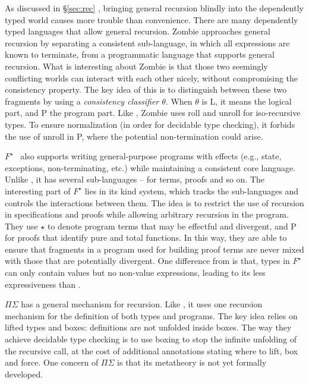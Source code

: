 As discussed in \S\ref{sec:rec}  , bringing general
recursion blindly into the dependently typed world causes more trouble
than convenience. There are many dependently typed languages that
allow general recursion. Zombie approaches general recursion by
separating a consistent sub-language, in which all expressions are
known to terminate, from a programmatic language that supports general
recursion. What is interesting about Zombie is that those two
seemingly conflicting worlds can interact with each other nicely,
without compromising the consistency property. The key idea of this is
to distinguish between these two fragments by using a
\emph{consistency classifier $\theta$}. When $\theta$ is \textsf{L},
it means the logical part, and \textsf{P} the program part. Like
\name, Zombie uses \textsf{roll} and \textsf{unroll} for iso-recursive
types. To ensure normalization (in order for decidable type checking),
it forbids the use of \textsf{unroll} in \textsf{P}, where the
potential non-termination could arise.

$F^{\star}$~\cite{Swamy2011} also supports writing general-purpose
programs with effects (e.g., state, exceptions, non-terminating, etc.)
while maintaining a consistent core language. Unlike \name, it has
several sub-languages -- for terms, proofs and so on. The interesting
part of $F^{\star}$ lies in its kind system, which tracks the
sub-languages and controls the interactions between them. The idea is
to restrict the use of recursion in specifications and proofs while
allowing arbitrary recursion in the program. They use $\star$ to
denote program terms that may be effectful and divergent, and
\textsf{P} for proofs that identify pure and total functions. In this
way, they are able to ensure that fragments in a program used for
building proof terms are never mixed with those that are potentially
divergent. One difference from \name is that, types in $F^{\star}$ can
only contain values but no non-value expressions, leading to its less
expressiveness than \name.

$\Pi\Sigma$ has a general mechanism for recursion. Like \name, it uses
one recursion mechanism for the definition of both types and
programs. The key idea relies on lifted types and boxes: definitions
are not unfolded inside boxes. The way they achieve decidable type
checking is to use boxing to stop the infinite unfolding of the
recursive call, at the cost of additional annotations stating where to
lift, box and force. One concern of $\Pi\Sigma$ is that its metatheory
is not yet formally developed.

